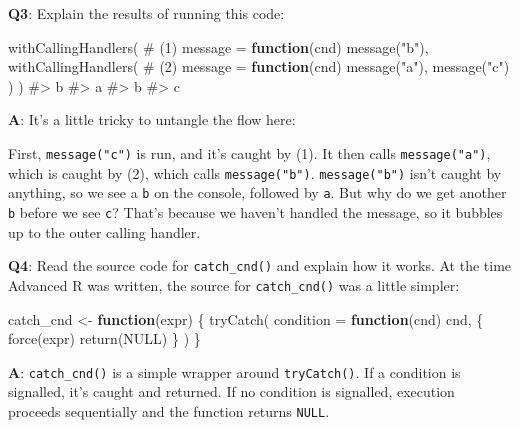 \documentclass[
]{krantz}
\makeatletter
\newenvironment{Shaded}{\begin{snugshade}}{\end{snugshade}}
\newcommand{\CommentTok}[1]{\textcolor[rgb]{0.56,0.35,0.01}{\textit{#1}}}
\newcommand{\ControlFlowTok}[1]{\textcolor[rgb]{0.13,0.29,0.53}{\textbf{#1}}}
\newcommand{\DataTypeTok}[1]{\textcolor[rgb]{0.13,0.29,0.53}{#1}}
\newcommand{\KeywordTok}[1]{\textcolor[rgb]{0.13,0.29,0.53}{\textbf{#1}}}
\newcommand{\NormalTok}[1]{#1}
\newcommand{\OtherTok}[1]{\textcolor[rgb]{0.56,0.35,0.01}{#1}}
\newcommand{\StringTok}[1]{\textcolor[rgb]{0.31,0.60,0.02}{#1}}
\newenvironment{kframe}{%
\medskip{}
\setlength{\fboxsep}{.8em}
 \def\at@end@of@kframe{}%
 \ifinner\ifhmode%
  \def\at@end@of@kframe{\end{minipage}}%
  \begin{minipage}{\columnwidth}%
 \fi\fi%
 \def\FrameCommand##1{\hskip\@totalleftmargin \hskip-\fboxsep
 \colorbox{shadecolor}{##1}\hskip-\fboxsep
     \hskip-\linewidth \hskip-\@totalleftmargin \hskip\columnwidth}%
 \MakeFramed {\advance\hsize-\width
   \@totalleftmargin\z@ \linewidth\hsize
   \@setminipage}}%
 {\par\unskip\endMakeFramed%
 \at@end@of@kframe}
\renewenvironment{Shaded}{\begin{kframe}}{\end{kframe}}
\renewcommand{\KeywordTok} [1]{\textcolor[rgb]{0.00,0.44,0.13}{{#1}}}
\renewcommand{\DataTypeTok}[1]{\textcolor[rgb]{0.56,0.13,0.00}{{#1}}}
\renewcommand{\StringTok}  [1]{\textcolor[rgb]{0.25,0.44,0.63}{{#1}}}
\renewcommand{\CommentTok} [1]{\textcolor[rgb]{0.38,0.63,0.69}{{#1}}}
\renewcommand{\OtherTok}   [1]{\textcolor[rgb]{0.00,0.44,0.13}{{#1}}}
\renewcommand{\NormalTok}  [1]{{#1}}
\makeatother
\begin{document}
\textbf{{Q3}}: Explain the results of running this code:

\begin{Shaded}
\begin{Highlighting}[]
\KeywordTok{withCallingHandlers}\NormalTok{( }\CommentTok{# (1)}
  \DataTypeTok{message =} \ControlFlowTok{function}\NormalTok{(cnd) }\KeywordTok{message}\NormalTok{(}\StringTok{"b"}\NormalTok{),}
  \KeywordTok{withCallingHandlers}\NormalTok{( }\CommentTok{# (2)}
    \DataTypeTok{message =} \ControlFlowTok{function}\NormalTok{(cnd) }\KeywordTok{message}\NormalTok{(}\StringTok{"a"}\NormalTok{),}
    \KeywordTok{message}\NormalTok{(}\StringTok{"c"}\NormalTok{)}
\NormalTok{  )}
\NormalTok{)}
\CommentTok{#> b}
\CommentTok{#> a}
\CommentTok{#> b}
\CommentTok{#> c}
\end{Highlighting}
\end{Shaded}

\textbf{{A}}: It's a little tricky to untangle the flow here:

First, \texttt{message("c")} is run, and it's caught by (1). It then calls \texttt{message("a")}, which is caught by (2), which calls \texttt{message("b")}. \texttt{message("b")} isn't caught by anything, so we see a \texttt{b} on the console, followed by \texttt{a}. But why do we get another \texttt{b} before we see \texttt{c}? That's because we haven't handled the message, so it bubbles up to the outer calling handler.

\textbf{{Q4}}: Read the source code for \texttt{catch\_cnd()} and explain how it works. At the time Advanced R was written, the source for \texttt{catch\_cnd()} was a little simpler:

\begin{Shaded}
\begin{Highlighting}[]
\NormalTok{catch_cnd <-}\StringTok{ }\ControlFlowTok{function}\NormalTok{(expr) \{}
  \KeywordTok{tryCatch}\NormalTok{(}
    \DataTypeTok{condition =} \ControlFlowTok{function}\NormalTok{(cnd) cnd,}
\NormalTok{    \{}
      \KeywordTok{force}\NormalTok{(expr)}
      \KeywordTok{return}\NormalTok{(}\OtherTok{NULL}\NormalTok{)}
\NormalTok{    \}}
\NormalTok{  )}
\NormalTok{\}}
\end{Highlighting}
\end{Shaded}

\textbf{{A}}: \texttt{catch\_cnd()} is a simple wrapper around \texttt{tryCatch()}. If a condition is signalled, it's caught and returned. If no condition is signalled, execution proceeds sequentially and the function returns \texttt{NULL}.
\end{document}
